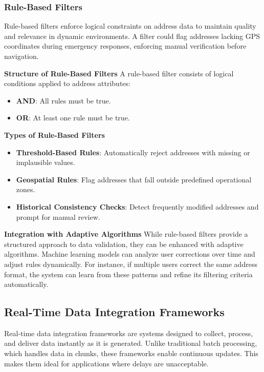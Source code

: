         
        \subsubsection{Rule-Based Filters}
        \label{sssec:rule-based-filters}
        
        Rule-based filters enforce logical constraints on address data to maintain quality and relevance in dynamic environments. A filter could flag addresses lacking GPS coordinates during emergency responses, enforcing manual verification before navigation.\blankLine
        
        
        \textbf{Structure of Rule-Based Filters}\blankLine
        A rule-based filter consists of logical conditions applied to address attributes:
        \begin{itemize}
            \item \textbf{AND}: All rules must be true.
            \item \textbf{OR}: At least one rule must be true.
        \end{itemize}
        

        \textbf{Types of Rule-Based Filters}
        \begin{itemize}
            \item \textbf{Threshold-Based Rules}: Automatically reject addresses with missing or implausible values.
            \item \textbf{Geospatial Rules}: Flag addresses that fall outside predefined operational zones.
            \item \textbf{Historical Consistency Checks}: Detect frequently modified addresses and prompt for manual review.
        \end{itemize}
        
        \textbf{Integration with Adaptive Algorithms}\blankLine
        While rule-based filters provide a structured approach to data validation, they can be enhanced with adaptive algorithms. Machine learning models can analyze user corrections over time and adjust rules dynamically. For instance, if multiple users correct the same address format, the system can learn from these patterns and refine its filtering criteria automatically.
        

    \subsection{Real-Time Data Integration Frameworks}
    Real-time data integration frameworks are systems designed to collect, process, and deliver data instantly as it is generated. Unlike traditional batch processing, which handles data in chunks, these frameworks enable continuous updates. This makes them ideal for applications where delays are unacceptable.

